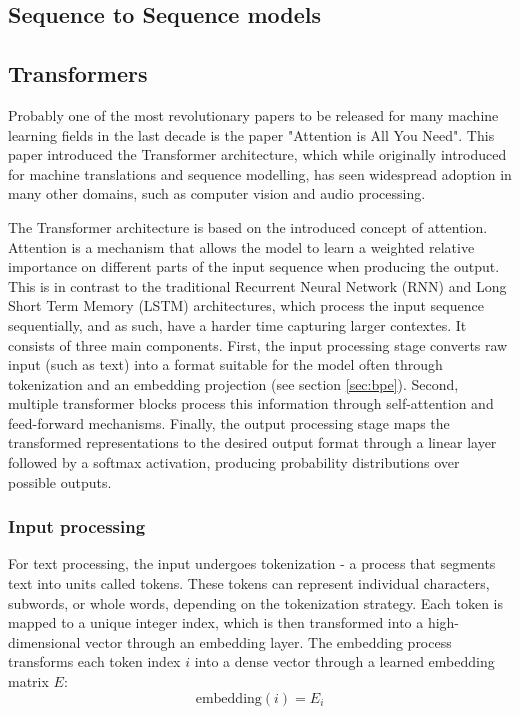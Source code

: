 \subsection{Sequence to Sequence models}

\subsection{Transformers}
Probably one of the most revolutionary papers to be released for many machine learning fields in the last decade is the paper "Attention is All You Need". \cite{vaswani_attention_2017} This paper introduced the Transformer architecture, which while originally introduced for machine translations and sequence modelling, has seen widespread adoption in many other domains, such as computer vision and audio processing.

The Transformer architecture is based on the introduced concept of attention. Attention is a mechanism that allows the model to learn a weighted relative importance on different parts of the input sequence when producing the output. This is in contrast to the traditional Recurrent Neural Network (RNN) and Long Short Term Memory (LSTM) architectures, which process the input sequence sequentially, and as such, have a harder time capturing larger contextes. It consists of three main components. First, the input processing stage converts raw input (such as text) into a format suitable for the model often through tokenization and an embedding projection (see section \ref{sec:bpe}). Second, multiple transformer blocks process this information through self-attention and feed-forward mechanisms. Finally, the output processing stage maps the transformed representations to the desired output format through a linear layer followed by a softmax activation, producing probability distributions over possible outputs.

\subsubsection{Input processing}
For text processing, the input undergoes tokenization - a process that segments text into units called tokens. These tokens can represent individual characters, subwords, or whole words, depending on the tokenization strategy. Each token is mapped to a unique integer index, which is then transformed into a high-dimensional vector through an embedding layer. The embedding process transforms each token index $i$ into a dense vector through a learned embedding matrix $E$:
\begin{equation}
\text{embedding}(i) = E_i
\end{equation}

